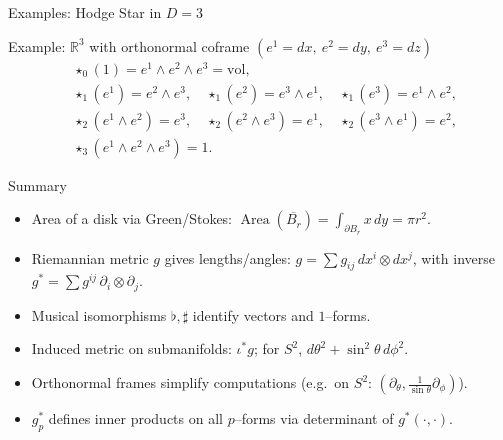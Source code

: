 \begin{frame}{Examples: Hodge Star in $D=3$}
\begin{block}{Example: $\mathbb{R}^3$ with orthonormal coframe $(e^1=dx,\ e^2=dy,\ e^3=dz)$}
\[
\begin{aligned}
&\star_0(1)=e^1\wedge e^2\wedge e^3=\mathrm{vol},\\
&\star_1(e^1)=e^2\wedge e^3,\quad \star_1(e^2)=e^3\wedge e^1,\quad \star_1(e^3)=e^1\wedge e^2,\\
&\star_2(e^1\wedge e^2)=e^3,\quad \star_2(e^2\wedge e^3)=e^1,\quad \star_2(e^3\wedge e^1)=e^2,\\
&\star_3(e^1\wedge e^2\wedge e^3)=1.
\end{aligned}
\]
\end{block}

\begin{center}
\end{center}
\end{frame}





\begin{frame}{Summary}
\begin{block}{}
\begin{itemize}
\item Area of a disk via Green/Stokes: $\displaystyle \operatorname{Area}(\overline{B_r})=\int_{\partial B_r} x\,dy=\pi r^2$.
\item Riemannian metric $g$ gives lengths/angles: $g=\sum g_{ij}\,dx^i\otimes dx^j$, with inverse $g^*=\sum g^{ij}\,\partial_i\otimes\partial_j$.
\item Musical isomorphisms $\flat,\sharp$ identify vectors and $1$–forms.
\item Induced metric on submanifolds: $\iota^*g$; for $S^2$, $d\theta^2+\sin^2\theta\,d\phi^2$.
\item Orthonormal frames simplify computations (e.g.\ on $S^2$: $(\partial_\theta,\frac{1}{\sin\theta}\partial_\phi)$).
\item $g^*_p$ defines inner products on all $p$–forms via determinant of $g^*(\cdot,\cdot)$.
\end{itemize}
\end{block}
\end{frame}

